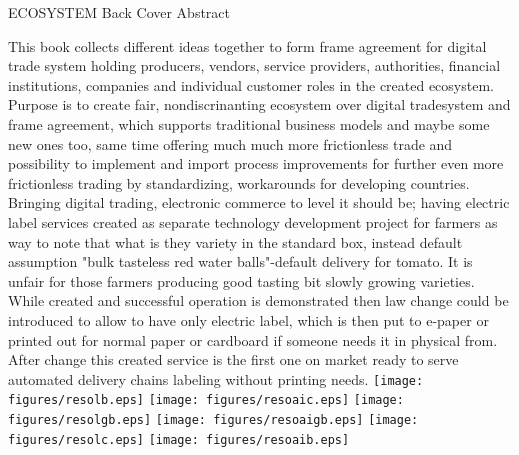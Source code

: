 %
%
%
ECOSYSTEM Back Cover Abstract\hfill
\label{abstract}
\linebreak

This book collects different ideas together to form frame agreement for digital trade system holding producers, vendors, service providers, authorities, financial institutions, companies and individual customer roles in the created ecosystem. Purpose is to create fair, nondiscrinanting ecosystem over digital tradesystem and frame agreement, which supports traditional business models and maybe some new ones too, same time offering much much more frictionless trade and possibility to implement and import process improvements for further even more frictionless trading by standardizing, workarounds for developing countries. Bringing digital trading, electronic commerce to level it should be; having electric label services created as separate technology development project for farmers as way to note that what is they variety in the standard box, instead default assumption "bulk tasteless red water balls"-default delivery for tomato. It is unfair for those farmers producing good tasting bit slowly growing varieties. While created and successful operation is demonstrated then law change could be introduced to allow to have only electric label, which is then put to e-paper or printed out for normal paper or cardboard if someone needs it in physical from. After change this created service is the first one on market ready to serve automated delivery chains labeling without printing needs.
\linebreak \vfill
\texttt{[image: figures/resolb.eps]} \hfill
\texttt{[image: figures/resoaic.eps]} \hfill
\texttt{[image: figures/resolgb.eps]} \hfill
\texttt{[image: figures/resoaigb.eps]} \hfill
\texttt{[image: figures/resolc.eps]} \hfill
\texttt{[image: figures/resoaib.eps]}

